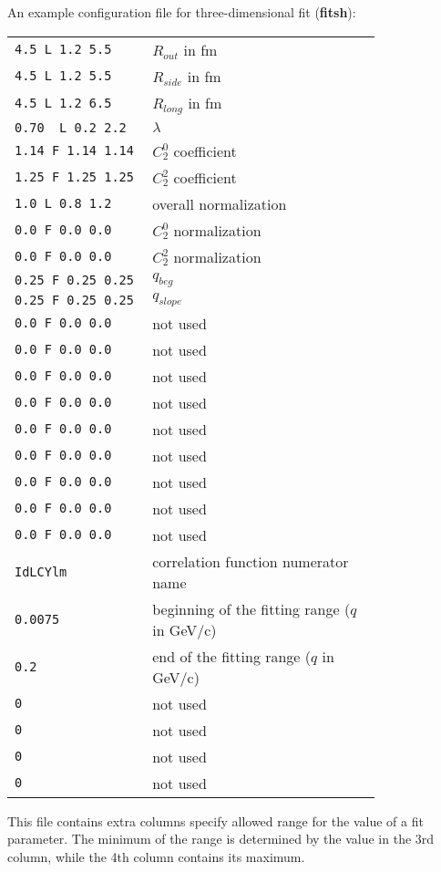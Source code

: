       An example configuration file for three-dimensional fit (\textbf{fitsh}):
      \begin{longtable}{p{0.3\linewidth}p{0.5\linewidth}}
        \verb|4.5 L 1.2 5.5|      & $R_{out}$ in fm\\
        \verb|4.5 L 1.2 5.5|      & $R_{side}$ in fm\\
        \verb|4.5 L 1.2 6.5|      & $R_{long}$ in fm\\
        \verb|0.70  L 0.2 2.2|    & $\lambda$\\
        \verb|1.14 F 1.14 1.14|   & $C_2^0$ coefficient\\
        \verb|1.25 F 1.25 1.25|   & $C_2^2$ coefficient\\
        \verb|1.0 L 0.8 1.2|      & overall normalization\\
        \verb|0.0 F 0.0 0.0|      & $C_2^0$ normalization\\
        \verb|0.0 F 0.0 0.0|      & $C_2^2$ normalization\\
        \verb|0.25 F 0.25 0.25|   & $q_{beg}$ \\
        \verb|0.25 F 0.25 0.25|   & $q_{slope}$ \\
        \verb|0.0 F 0.0 0.0|      & not used\\
        \verb|0.0 F 0.0 0.0|      & not used\\
        \verb|0.0 F 0.0 0.0|      & not used\\
        \verb|0.0 F 0.0 0.0|      & not used\\
        \verb|0.0 F 0.0 0.0|      & not used\\
        \verb|0.0 F 0.0 0.0|      & not used\\
        \verb|0.0 F 0.0 0.0|      & not used\\
        \verb|0.0 F 0.0 0.0|      & not used\\
        \verb|0.0 F 0.0 0.0|      & not used\\
        \verb|IdLCYlm|            & correlation function numerator name\\
        \verb|0.0075|             & beginning of the fitting range ($q$ in GeV/c)\\
        \verb|0.2|                & end of the fitting range ($q$ in GeV/c)\\
        \verb|0|                  & not used\\
        \verb|0|                  & not used\\
        \verb|0|                  & not used\\
        \verb|0|                  & not used\\
      \end{longtable}
      This file contains extra columns specify allowed range for the value of a fit parameter.
      The minimum of the range is determined by the value in the 3rd column, while the 4th column contains its maximum.

